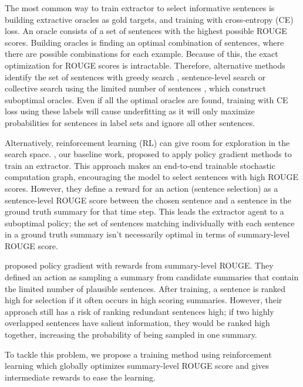 \documentclass[11pt,a4paper]{article}
\begin{document}
The most common way to train extractor to select
informative sentences is building extractive oracles
as gold targets, and training with cross-entropy (CE) loss.
An oracle consists of a set of sentences with the highest possible
ROUGE scores. Building oracles is finding an optimal combination of sentences,
where there are  possible combinations for each example.
Because of this, the exact optimization for ROUGE scores is intractable. 
Therefore, alternative methods identify the set of sentences
with greedy search \cite{nallapati2017summarunner},
sentence-level search \cite{hsu-etal-2018-unified, shi2019deepchannel}
or collective search using the limited number of sentences \cite{xu2019neural},
which construct suboptimal oracles.
Even if all the optimal oracles are found,
training with CE loss using these labels will cause underfitting
as it will only maximize probabilities for sentences
in label sets and ignore all other sentences.

Alternatively, reinforcement learning (RL) can give room for exploration in the search space.
\citet{chen-bansal-2018-fast}, our baseline work,
proposed to apply policy gradient methods to train an extractor.
This approach makes an end-to-end trainable stochastic
computation graph, encouraging the model to select sentences
with high ROUGE scores. However, they define a reward for an action
(sentence selection) as a sentence-level ROUGE score between
the chosen sentence and a sentence in the ground truth summary
for that time step. This leads the extractor agent to a suboptimal policy;
the set of sentences matching individually with each sentence in a ground truth summary
isn't necessarily optimal in terms of summary-level ROUGE score.

\citet{narayan-etal-2018-ranking} proposed policy gradient
with rewards from summary-level ROUGE.
They defined an action as sampling a summary from candidate summaries
that contain the limited number of plausible sentences. After training,
a sentence is ranked high for selection
if it often occurs in high scoring summaries.
However, their approach still has a risk of ranking redundant sentences high;
if two highly overlapped sentences have salient information,
they would be ranked high together, increasing the probability of being sampled
in one summary.

To tackle this problem, we propose a training method
using reinforcement learning which globally optimizes
summary-level ROUGE score and gives intermediate rewards
to ease the learning.
\end{document}
